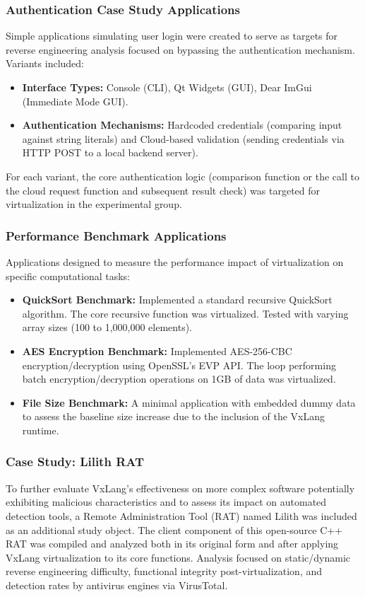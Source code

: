 \subsubsection{Authentication Case Study Applications} Simple applications simulating user login were created to serve as targets for reverse engineering analysis focused on bypassing the authentication mechanism. Variants included:
    \begin{itemize}
        \item \textbf{Interface Types:} Console (CLI), Qt Widgets (GUI), Dear ImGui (Immediate Mode GUI).
        \item \textbf{Authentication Mechanisms:} Hardcoded credentials (comparing input against string literals) and Cloud-based validation (sending credentials via HTTP POST to a local backend server).
    \end{itemize}
    For each variant, the core authentication logic (comparison function or the call to the cloud request function and subsequent result check) was targeted for virtualization in the experimental group.

\subsubsection{Performance Benchmark Applications} Applications designed to measure the performance impact of virtualization on specific computational tasks:
    \begin{itemize}
        \item \textbf{QuickSort Benchmark:} Implemented a standard recursive QuickSort algorithm. The core recursive function was virtualized. Tested with varying array sizes (100 to 1,000,000 elements).
        \item \textbf{AES Encryption Benchmark:} Implemented AES-256-CBC encryption/decryption using OpenSSL's EVP API. The loop performing batch encryption/decryption operations on 1GB of data was virtualized.
        \item \textbf{File Size Benchmark:} A minimal application with embedded dummy data to assess the baseline size increase due to the inclusion of the VxLang runtime.
    \end{itemize}

\subsubsection{Case Study: Lilith RAT}
To further evaluate VxLang's effectiveness on more complex software potentially exhibiting malicious characteristics and to assess its impact on automated detection tools, a Remote Administration Tool (RAT) named Lilith \cite{LilithRAT} was included as an additional study object. The client component of this open-source C++ RAT was compiled and analyzed both in its original form and after applying VxLang virtualization to its core functions. Analysis focused on static/dynamic reverse engineering difficulty, functional integrity post-virtualization, and detection rates by antivirus engines via VirusTotal.

